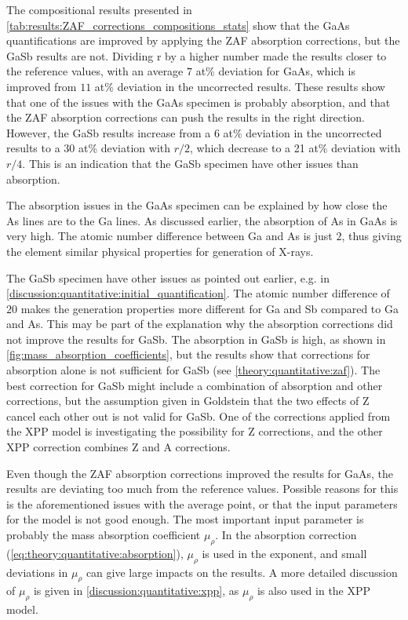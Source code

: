 The compositional results presented in \cref{tab:results:ZAF_corrections_compositions_stats} show that the GaAs quantifications are improved by applying the ZAF absorption corrections, but the GaSb results are not.
Dividing r by a higher number made the results closer to the reference values, with an average $7$ at\% deviation for GaAs, which is improved from $11$ at\% deviation in the uncorrected results.
These results show that one of the issues with the GaAs specimen is probably absorption, and that the ZAF absorption corrections can push the results in the right direction.
However, the GaSb results increase from a $6$ at\% deviation in the uncorrected results to a $30$ at\% deviation with $r/2$, which decrease to a 21 at\% deviation with $r/4$.
This is an indication that the GaSb specimen have other issues than absorption.


The absorption issues in the GaAs specimen can be explained by how close the As lines are to the Ga lines.
As discussed earlier, the absorption of As in GaAs is very high.
The atomic number difference between Ga and As is just $2$, thus giving the element similar physical properties for generation of X-rays.


The GaSb specimen have other issues as pointed out earlier, e.g. in \cref{discussion:quantitative:initial_quantification}.
The atomic number difference of $20$ makes the generation properties more different for Ga and Sb compared to Ga and As.
This may be part of the explanation why the absorption corrections did not improve the results for GaSb.
The absorption in GaSb is high, as shown in \cref{fig:mass_absorption_coefficients}, but the results show that corrections for absorption alone is not sufficient for GaSb (see \cref{theory:quantitative:zaf}).
The best correction for GaSb might include a combination of absorption and other corrections, but the assumption given in Goldstein \cite[p. 300]{goldstein_scanning_2018} that the two effects of Z cancel each other out is not valid for GaSb.
One of the corrections applied from the XPP model is investigating the possibility for Z corrections, and the other XPP correction combines Z and A corrections.


Even though the ZAF absorption corrections improved the results for GaAs, the results are deviating too much from the reference values.
Possible reasons for this is the aforementioned issues with the average point, or that the input parameters for the model is not good enough.
The most important input parameter is probably the mass absorption coefficient $\mu_\rho$.
In the absorption correction (\cref{eq:theory:quantitative:absorption}), $\mu_\rho$ is used in the exponent, and small deviations in $\mu_\rho$ can give large impacts on the results.
A more detailed discussion of $\mu_\rho$ is given in \cref{discussion:quantitative:xpp}, as $\mu_\rho$ is also used in the XPP model.



